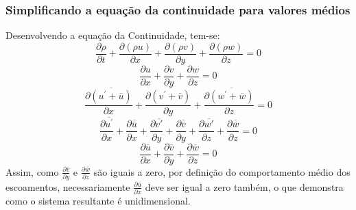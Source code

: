 \documentclass[xcolor=dvipsnames,10pt,aspectratio=169]{beamer}
\begin{document}
		
		
		
		
		\begin{frame}
			\frametitle{Simplificando a equação da continuidade para valores médios}
			Desenvolvendo a equação da Continuidade, tem-se:
			\begin{equation*}
			\frac{\partial \rho}{\partial t} +  \frac{\partial (\rho u)}{\partial x} + \frac{\partial ( \rho v)}{\partial y} + \frac{\partial (\rho w)}{\partial z} = 0
			\end{equation*}
			\begin{equation}
			\frac{\partial u}{\partial x} + \frac{\partial v}{\partial y} + \frac{\partial w}{\partial z} = 0
			\end{equation}
			\begin{equation}
			\frac{\partial \overline{(u^\prime + \overline{u})}}{\partial x} + \frac{\partial \overline{(v^\prime + \overline{v})}}{\partial y} + \frac{\partial \overline{(w^\prime + \overline{w})}}{\partial z} = 0
			\end{equation}
			\begin{equation}
			\frac{\partial \overline{u^\prime}}{\partial x} +\frac{\partial \overline{\overline{u}}}{\partial x} + \frac{\partial \overline{v\prime}}{\partial y} +\frac{\partial \overline{\overline{v}}}{\partial y} + \frac{\partial \overline{w\prime}}{\partial z} +\frac{\partial \overline{\overline{w}}}{\partial z} = 0
			\end{equation}
			\begin{equation}
			\frac{\partial {\overline{u}}}{\partial x} +\frac{\partial {\overline{v}}}{\partial y} +\frac{\partial {\overline{w}}}{\partial z} = 0
			\end{equation}
			Assim, como $ \frac{\partial {\overline{v}}}{\partial y} $ e $ \frac{\partial {\overline{w}}}{\partial z}$ são iguais a zero, por definição do comportamento médio dos escoamentos, necessariamente $\frac{\partial {\overline{u}}}{\partial x}$ deve ser igual a zero também, o que demonstra como o sistema resultante é unidimensional.
		\end{frame}
		
		
		
\end{document}
